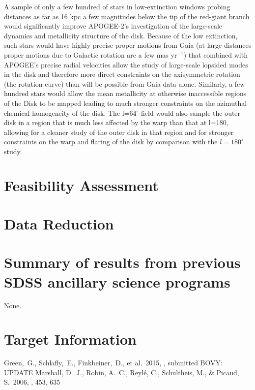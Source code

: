 \documentclass[12pt,preprint]{aastex}
\newcommand{\etal}{et al.}
\begin{document}
A sample of only a few hundred of stars in low-extinction windows
probing distances as far as 16 kpc a few magnitudes below the tip of
the red-giant branch would significantly improve APOGEE-2's
investigation of the large-scale dynamics and metallicity structure of
the disk. Because of the low extinction, such stars would have highly
precise proper motions from Gaia (at large distances proper motions
due to Galactic rotation are a few mas yr$^{-1}$) that combined with
APOGEE’s precise radial velocities allow the study of large-scale
lopsided modes in the disk and therefore more direct constraints on
the axisymmetric rotation (the rotation curve) than will be possible
from Gaia data alone. Similarly, a few hundred stars would allow the
mean metallicity at otherwise inaccessible regions of the Disk to be
mapped leading to much stronger constraints on the azimuthal chemical
homogeneity of the disk. The l=64$^\circ$ field would also sample the
outer disk in a region that is much less affected by the warp than
that at l=180, allowing for a cleaner study of the outer disk in that
region and for stronger constraints on the warp and flaring of the
disk by comparison with the $l=180^\circ$ study.

\section{Feasibility Assessment}

\section{Data Reduction}

\section{Summary of results from previous SDSS ancillary science programs}

None.

\newpage

\section{Target Information}

\begin{thebibliography}{}
\bibitem[Green \etal(2015)]{Green15a}
  Green,~G., Schlafly,~E., Finkbeiner,~D., \etal\ 2015, \apj, submitted BOVY: UPDATE
\bibitem[Marshall \etal(2006)]{Marshall06a}
  Marshall, D.~J., Robin, A.~C., Reyl{\'e}, C., Schultheis, M., \& Picaud, S.\ 2006, \aap, 453, 635
\end{thebibliography}
\end{document}
